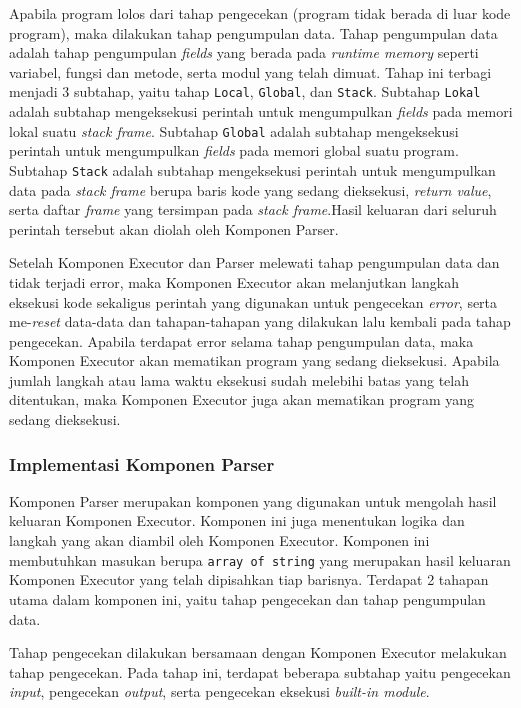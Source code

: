 Apabila program lolos dari tahap pengecekan (program tidak berada di luar kode program), maka dilakukan tahap pengumpulan data. Tahap pengumpulan data adalah tahap pengumpulan \textit{fields} yang berada pada \textit{runtime memory} seperti variabel, fungsi dan metode, serta modul yang telah dimuat. Tahap ini terbagi menjadi 3 subtahap, yaitu tahap \verb|Local|, \verb|Global|, dan \verb|Stack|. Subtahap \verb|Lokal| adalah subtahap mengeksekusi perintah untuk mengumpulkan \textit{fields} pada memori lokal suatu \textit{stack frame}. Subtahap \verb|Global| adalah subtahap mengeksekusi perintah untuk mengumpulkan \textit{fields} pada memori global suatu program. Subtahap \verb|Stack| adalah subtahap mengeksekusi perintah untuk mengumpulkan data pada \textit{stack frame} berupa baris kode yang sedang dieksekusi, \textit{return value}, serta daftar \textit{frame} yang tersimpan pada \textit{stack frame}.Hasil keluaran dari seluruh perintah tersebut akan diolah oleh Komponen Parser.

Setelah Komponen Executor dan Parser melewati tahap pengumpulan data dan tidak terjadi error, maka Komponen Executor akan melanjutkan langkah eksekusi kode sekaligus perintah yang digunakan untuk pengecekan \textit{error}, serta me-\textit{reset} data-data dan tahapan-tahapan yang dilakukan lalu kembali pada tahap pengecekan. Apabila terdapat error selama tahap pengumpulan data, maka Komponen Executor akan mematikan program yang sedang dieksekusi. Apabila jumlah langkah atau lama waktu eksekusi sudah melebihi batas yang telah ditentukan, maka Komponen Executor juga akan mematikan program yang sedang dieksekusi.

\subsubsection{Implementasi Komponen Parser}
Komponen Parser merupakan komponen yang digunakan untuk mengolah hasil keluaran Komponen Executor. Komponen ini juga menentukan logika dan langkah yang akan diambil oleh Komponen Executor. Komponen ini membutuhkan masukan berupa \verb|array of string| yang merupakan hasil keluaran Komponen Executor yang telah dipisahkan tiap barisnya. Terdapat 2 tahapan utama dalam komponen ini, yaitu tahap pengecekan dan tahap pengumpulan data.

Tahap pengecekan dilakukan bersamaan dengan Komponen Executor melakukan tahap pengecekan. Pada tahap ini, terdapat beberapa subtahap yaitu pengecekan \textit{input}, pengecekan \textit{output}, serta pengecekan eksekusi \textit{built-in module}.

